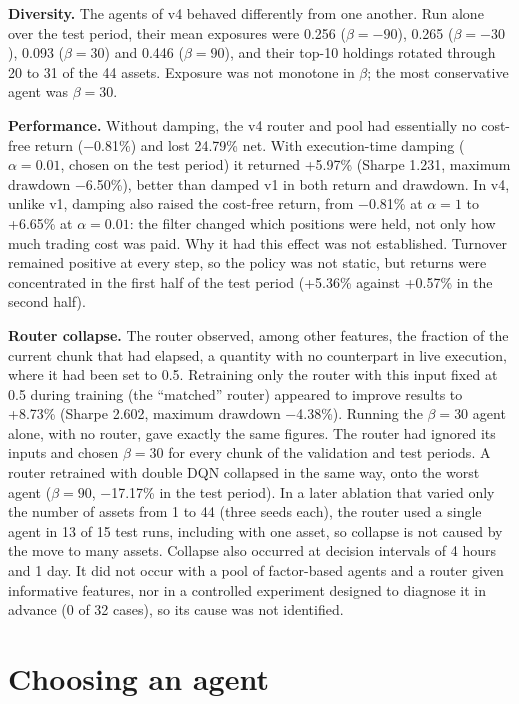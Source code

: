 \documentclass[12pt,a4paper]{report}
\begin{document}
\textbf{Diversity.} The agents of v4 behaved differently from one
another. Run alone over the test period, their mean exposures were 0.256
(\(\beta=-90\)), 0.265 (\(\beta=-30\)), 0.093 (\(\beta=30\)) and 0.446
(\(\beta=90\)), and their top-10 holdings rotated through 20 to 31 of
the 44 assets. Exposure was not monotone in \(\beta\); the most
conservative agent was \(\beta=30\).

\textbf{Performance.} Without damping, the v4 router and pool had
essentially no cost-free return (−0.81\%) and lost 24.79\% net. With
execution-time damping (\(\alpha=0.01\), chosen on the test period) it
returned +5.97\% (Sharpe 1.231, maximum drawdown −6.50\%), better than
damped v1 in both return and drawdown. In v4, unlike v1, damping also
raised the cost-free return, from −0.81\% at \(\alpha=1\) to +6.65\% at
\(\alpha=0.01\): the filter changed which positions were held, not only
how much trading cost was paid. Why it had this effect was not
established. Turnover remained positive at every step, so the policy was
not static, but returns were concentrated in the first half of the test
period (+5.36\% against +0.57\% in the second half).

\textbf{Router collapse.} The router observed, among other features, the
fraction of the current chunk that had elapsed, a quantity with no
counterpart in live execution, where it had been set to 0.5. Retraining
only the router with this input fixed at 0.5 during training (the
``matched'' router) appeared to improve results to +8.73\% (Sharpe
2.602, maximum drawdown −4.38\%). Running the \(\beta=30\) agent alone,
with no router, gave exactly the same figures. The router had ignored
its inputs and chosen \(\beta=30\) for every chunk of the validation and
test periods. A router retrained with double DQN collapsed in the same
way, onto the worst agent (\(\beta=90\), −17.17\% in the test period).
In a later ablation that varied only the number of assets from 1 to 44
(three seeds each), the router used a single agent in 13 of 15 test
runs, including with one asset, so collapse is not caused by the move to
many assets. Collapse also occurred at decision intervals of 4 hours and
1 day. It did not occur with a pool of factor-based agents and a router
given informative features, nor in a controlled experiment designed to
diagnose it in advance (0 of 32 cases), so its cause was not identified.

\section{Choosing an agent}\label{choosing-an-agent}
\end{document}
